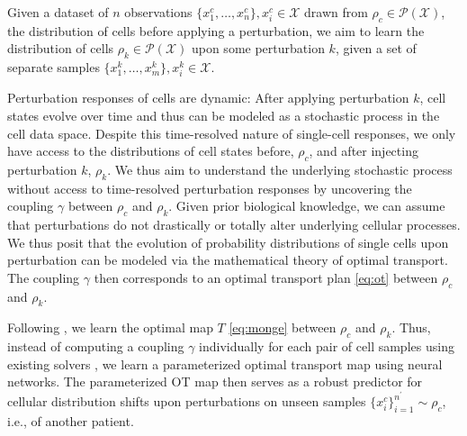 Given a dataset of $n$ observations $\{ x_1^c, \dots, x_n^c \}, x_i^c \in \mathcal{X}$ drawn from $\rho_c \in \mathcal{P}(\mathcal{X})$, the distribution of cells before applying a perturbation,
we aim to learn the distribution of cells $\rho_k \in \mathcal{P}(\mathcal{X})$ upon some perturbation $k$, given a set of separate samples $\{ x_1^k, \dots, x_m^k \}, x_i^k \in \mathcal{X}$.

Perturbation responses of cells are dynamic: After applying perturbation $k$, cell states evolve over time and thus can be modeled as a stochastic process in the cell data space.
Despite this time-resolved nature of single-cell responses, we only have access to the distributions of cell states before, $\rho_c$, and after injecting perturbation $k$, $\rho_k$. 
We thus aim to understand the underlying stochastic process without access to time-resolved perturbation responses by uncovering the coupling $\gamma$ between $\rho_c$ and $\rho_k$.
Given prior biological knowledge, we can assume that perturbations do not drastically or totally alter underlying cellular processes. We thus posit that the evolution of probability distributions of single cells upon perturbation
can be modeled via the mathematical theory of optimal transport.
The coupling $\gamma$ then corresponds to an optimal transport plan \eqref{eq:ot} between $\rho_c$ and $\rho_k$.

Following \citet{makkuva2020optimal}, we learn the optimal map $T$ \eqref{eq:monge} between $\rho_c$ and $\rho_k$.
Thus, instead of computing a coupling $\gamma$ individually for each pair of cell samples using existing solvers \citep{cuturi2013sinkhorn}, we learn a parameterized optimal transport map using neural networks. The parameterized OT map then serves as a robust predictor for cellular distribution shifts upon perturbations on unseen samples $\{x_i^{c} \}_{i=1}^{n^\prime} \sim \rho_c$, i.e., of another patient.




